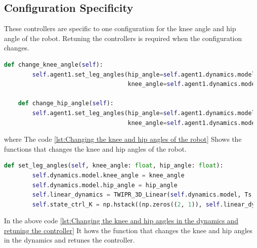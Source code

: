 \subsection{Configuration Specificity}
These controllers are specific to one configuration for the knee angle and hip angle of the robot.
Retuning the controllers is required when the configuration changes.
\begin{lstlisting}[language=Python, caption=Changing the knee and hip angles of the robot, label={lst:Changing the knee and hip angles of the robot}]
    def change_knee_angle(self):
        self.agent1.set_leg_angles(hip_angle=self.agent1.dynamics.model.hip_angle,
                                   knee_angle=self.agent1.dynamics.model.knee_angle + deg2rad(5))

    def change_hip_angle(self):
        self.agent1.set_leg_angles(hip_angle=self.agent1.dynamics.model.hip_angle + deg2rad(5),
                                   knee_angle=self.agent1.dynamics.model.knee_angle)
\end{lstlisting}
where The code \ref{lst:Changing the knee and hip angles of the robot} Shows the functions that changes the knee and hip angles of the robot.
\begin{lstlisting}[language=Python, caption=Changing the knee and hip angles in the dynamics and retuning the controller, label={lst:Changing the knee and hip angles in the dynamics and retuning the controller}]
    def set_leg_angles(self, knee_angle: float, hip_angle: float):
        self.dynamics.model.knee_angle = knee_angle
        self.dynamics.model.hip_angle = hip_angle
        self.linear_dynamics = TWIPR_3D_Linear(self.dynamics.model, Ts, self.poles, self.eigenvectors)
        self.state_ctrl_K = np.hstack((np.zeros((2, 1)), self.linear_dynamics.K))
\end{lstlisting}
In the above code \ref{lst:Changing the knee and hip angles in the dynamics and retuning the controller} It hows the function that changes the knee and hip angles in the dynamics and retunes the controller.



